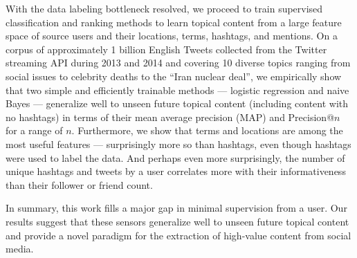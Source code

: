 With the data labeling bottleneck resolved, we proceed to train
supervised classification and ranking methods to learn topical content
from a large feature space of source users and their locations, terms,
hashtags, and mentions.  On a corpus of approximately 1 billion
English Tweets
collected from the Twitter streaming API during 2013 and 2014 and
covering 10 diverse topics ranging from social issues to celebrity
deaths to the ``Iran nuclear deal'', we empirically show that two
simple and efficiently trainable methods --- logistic regression and
naive Bayes --- generalize well to unseen future topical content
(including content with no hashtags) in terms of their mean average
precision (MAP) and Precision@$n$ for a range of $n$.  Furthermore, we
show that terms and locations are among the most useful features ---
surprisingly more so than hashtags, even though hashtags were used to
label the data.  And perhaps even more surprisingly, the number of
unique hashtags and tweets by a user correlates more with their
informativeness than their follower or friend count.

In summary, this work fills a major gap in 
minimal supervision from a user.  Our results suggest that these
sensors generalize well to unseen future topical content and provide a
novel paradigm for the extraction of high-value content from social
media.


